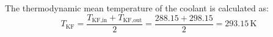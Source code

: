 The thermodynamic mean temperature of the coolant is calculated as:  
\[
T_{\text{KF}} = \frac{T_{\text{KF,in}} + T_{\text{KF,out}}}{2} = \frac{288.15 + 298.15}{2} = 293.15 \, \text{K}
\]